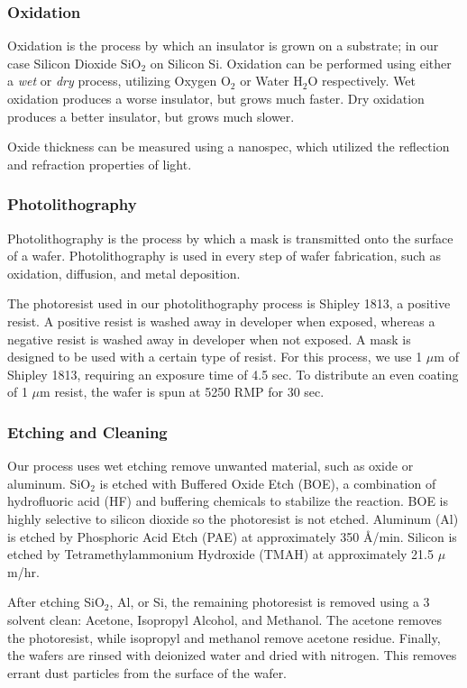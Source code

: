 \documentclass[letter,12pt]{article}
\begin{document}
		\subsubsection{Oxidation}\label{sec:Oxidation}
			\FloatBarrier
			Oxidation is the process by which an insulator is grown on a substrate; in our case Silicon Dioxide SiO$_2$ on Silicon Si. Oxidation can be performed using either a \textit{wet} or \textit{dry} process, utilizing Oxygen O$_2$ or Water H$_2$O respectively. Wet oxidation produces a worse insulator, but grows much faster.  Dry oxidation produces a better insulator, but grows much slower. 
			
			Oxide thickness can be measured using a nanospec, which utilized the reflection and refraction properties of light.
			
		\subsubsection{Photolithography}
			Photolithography is the process by which a mask is transmitted onto the surface of a wafer.  Photolithography is used in every step of wafer fabrication, such as oxidation, diffusion, and metal deposition. 
			
			The photoresist used in our photolithography process is Shipley 1813, a positive resist.  A positive resist is washed away in developer when exposed, whereas a negative resist is washed away in developer when not exposed. A mask is designed to be used with a certain type of resist. For this process, we use 1 $\mu$m of Shipley 1813, requiring an exposure time of 4.5 sec. To distribute an even coating of 1 $\mu$m resist, the wafer is spun at 5250 RMP for 30 sec. \cite{Shipley_1800}
		
		\subsubsection{Etching and Cleaning}
			Our process uses wet etching remove unwanted material, such as oxide or aluminum. SiO$_2$ is etched with Buffered Oxide Etch (BOE), a combination of hydrofluoric acid (HF) and buffering chemicals to stabilize the reaction. BOE is highly selective to silicon dioxide so the photoresist is not etched.  Aluminum (Al) is etched by Phosphoric Acid Etch (PAE) at approximately 350 \AA/min. \cite{407_Lab_Manual} Silicon is etched by Tetramethylammonium Hydroxide (TMAH) at approximately 21.5 $\mu$m/hr. \cite{408_Lab_Manual}
			
			After etching SiO$_2$, Al, or Si, the remaining photoresist is removed using a 3 solvent clean: Acetone, Isopropyl Alcohol, and Methanol. The acetone removes the photoresist, while isopropyl and methanol remove acetone residue. Finally, the wafers are rinsed with deionized water and dried with nitrogen. This removes errant dust particles from the surface of the wafer. \cite{407_Lab_Manual}
			
\end{document}
